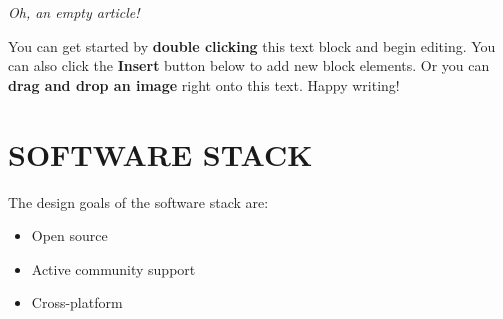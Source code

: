 \textit{Oh, an empty article!} 

You can get started by \textbf{double clicking} this text block and begin editing. You can also click the \textbf{Insert} button below to add new block elements. Or you can \textbf{drag and drop an image} right onto this text. Happy writing!

\section{SOFTWARE STACK}

The design goals of the software stack are:
\begin{itemize}
\item Open source
\item Active community support
\item Cross-platform
\end{itemize}


    
    